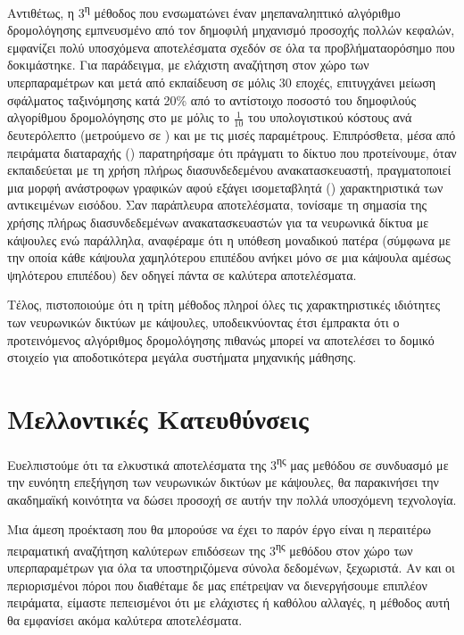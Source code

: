 Αντιθέτως, η 3\textsuperscript{η} μέθοδος που ενσωματώνει έναν μη\textendash επαναληπτικό αλγόριθμο δρομολόγησης εμπνευσμένο από τον δημοφιλή μηχανισμό προσοχής πολλών κεφαλών, εμφανίζει πολύ υποσχόμενα αποτελέσματα σχεδόν σε όλα τα προβλήματα\textendash ορόσημο που δοκιμάστηκε. Για παράδειγμα, με ελάχιστη αναζήτηση στον χώρο των υπερπαραμέτρων και μετά από εκπαίδευση σε μόλις 30 εποχές, επιτυγχάνει μείωση σφάλματος ταξινόμησης κατά 20\% από το αντίστοιχο ποσοστό του δημοφιλούς αλγορίθμου δρομολόγησης  στο   με μόλις το $\frac{1}{10}$ του υπολογιστικού κόστους ανά δευτερόλεπτο (μετρούμενο σε ) και με τις μισές παραμέτρους. Επιπρόσθετα, μέσα από πειράματα διαταραχής () παρατηρήσαμε ότι πράγματι το δίκτυο που προτείνουμε, όταν εκπαιδεύεται με τη χρήση πλήρως διασυνδεδεμένου ανακατασκευαστή, πραγματοποιεί μια μορφή ανάστροφων γραφικών αφού εξάγει ισομεταβλητά () χαρακτηριστικά των αντικειμένων εισόδου. Σαν παράπλευρα αποτελέσματα, τονίσαμε τη σημασία της χρήσης πλήρως διασυνδεδεμένων ανακατασκευαστών για τα νευρωνικά δίκτυα με κάψουλες ενώ παράλληλα, αναφέραμε ότι η υπόθεση μοναδικού πατέρα (σύμφωνα με την οποία κάθε κάψουλα χαμηλότερου επιπέδου ανήκει μόνο σε μια κάψουλα αμέσως ψηλότερου επιπέδου) δεν οδηγεί πάντα σε καλύτερα αποτελέσματα.\par

Τέλος, πιστοποιούμε ότι η τρίτη μέθοδος πληροί όλες τις χαρακτηριστικές ιδιότητες των νευρωνικών δικτύων με κάψουλες, υποδεικνύοντας έτσι έμπρακτα ότι ο προτεινόμενος αλγόριθμος δρομολόγησης πιθανώς μπορεί να αποτελέσει το δομικό στοιχείο για αποδοτικότερα μεγάλα συστήματα μηχανικής μάθησης.

\section{Μελλοντικές Κατευθύνσεις}
Ευελπιστούμε ότι τα ελκυστικά αποτελέσματα της 3\textsuperscript{ης} μας μεθόδου σε συνδυασμό με την ευνόητη επεξήγηση των νευρωνικών δικτύων με κάψουλες, θα παρακινήσει την ακαδημαϊκή κοινότητα να δώσει προσοχή σε αυτήν την πολλά υποσχόμενη τεχνολογία.\par

Μια άμεση προέκταση που θα μπορούσε να έχει το παρόν έργο είναι η περαιτέρω πειραματική αναζήτηση καλύτερων επιδόσεων της 3\textsuperscript{ης} μεθόδου στον χώρο των υπερπαραμέτρων για όλα τα υποστηριζόμενα σύνολα δεδομένων, ξεχωριστά. Αν και οι περιορισμένοι πόροι που διαθέταμε δε μας επέτρεψαν να διενεργήσουμε επιπλέον πειράματα, είμαστε πεπεισμένοι ότι με ελάχιστες ή καθόλου αλλαγές, η μέθοδος αυτή θα εμφανίσει ακόμα καλύτερα αποτελέσματα.\par

